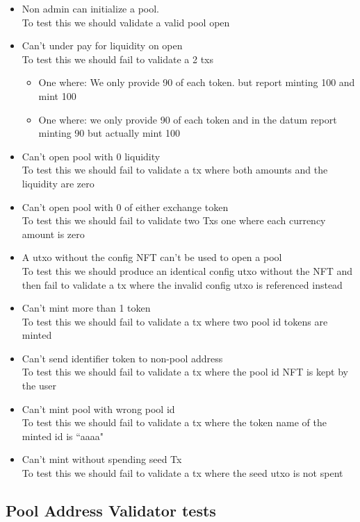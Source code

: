 \documentclass{article}
\begin{document}
\begin{itemize}
	\item Non admin can initialize a pool.
		\\ To test this we should validate a valid pool open
	\item Can't under pay for liquidity on open
		\\ To test this we should fail to validate a 2 txs
			\begin{itemize}
				\item One where:
					We only provide 90 of each token.
					but report minting 100
					and mint 100
				\item One where:
					we only provide 90 of each token
					and in the datum report minting 90
					but actually mint 100
			\end{itemize}
	\item Can't open pool with 0 liquidity
		\\ To test this we should fail to validate a tx where
			both amounts and the liquidity are zero
	\item Can't open pool with 0 of either exchange token
		\\ To test this we should fail to validate two Txs
		one where each currency amount is zero
	\item A utxo without the config NFT can't be used to open a pool
		\\ To test this we should
		produce an identical config utxo without the NFT
		and then fail to validate a tx
		where the invalid config utxo is referenced instead
	\item Can't mint more than 1 token
		\\ To test this we should fail to validate a tx where
		two pool id tokens are minted
	\item Can't send identifier token to non-pool address
		\\ To test this we should fail to validate a tx where
		the pool id NFT is kept by the user
	\item Can't mint pool with wrong pool id
		\\ To test this we should fail to validate a tx where
		the token name of the minted id is ``aaaa"
	\item Can't mint without spending seed Tx
		\\ To test this we should fail to validate a tx where
		the seed utxo is not spent
\end{itemize}

\subsection*{Pool Address Validator tests}
\end{document}
